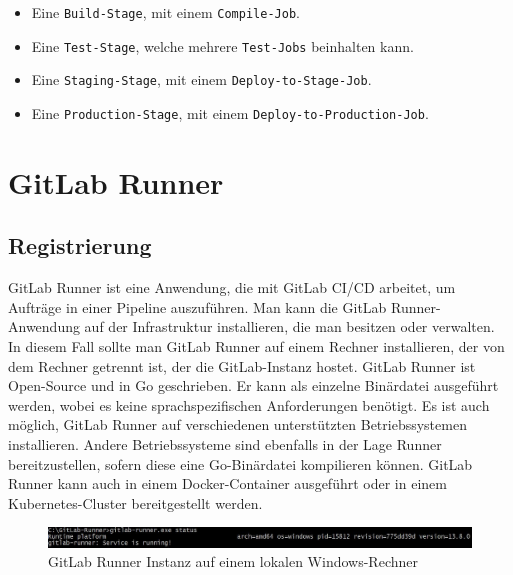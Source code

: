\begin{itemize}
	\item Eine \colorbox{MyLightGrayBackgroundForCode}{\texttt{Build-Stage}}, mit einem \colorbox{MyLightGrayBackgroundForCode}{\texttt{Compile-Job}}.
	\item Eine \colorbox{MyLightGrayBackgroundForCode}{\texttt{Test-Stage}}, welche mehrere \colorbox{MyLightGrayBackgroundForCode}{\texttt{Test-Jobs}} beinhalten kann.
	\item Eine \colorbox{MyLightGrayBackgroundForCode}{\texttt{Staging-Stage}}, mit einem \colorbox{MyLightGrayBackgroundForCode}{\texttt{Deploy-to-Stage-Job}}.
	\item Eine \colorbox{MyLightGrayBackgroundForCode}{\texttt{Production-Stage}}, mit einem \colorbox{MyLightGrayBackgroundForCode}{\texttt{Deploy-to-Production-Job}}.
\end{itemize}

\section{GitLab Runner} \label{sec:lblGitLabRunner}
\subsection{Registrierung}

GitLab Runner ist eine Anwendung, die mit GitLab CI/CD arbeitet, um Aufträge in einer Pipeline auszuführen.
Man kann die GitLab Runner-Anwendung auf der Infrastruktur installieren, die man besitzen oder verwalten. In diesem Fall sollte man GitLab Runner auf einem Rechner installieren, der von dem Rechner getrennt ist, der die GitLab-Instanz hostet. GitLab Runner ist Open-Source und in Go geschrieben. Er kann als einzelne Binärdatei ausgeführt werden, wobei es keine sprachspezifischen Anforderungen benötigt.
Es ist auch möglich, GitLab Runner auf verschiedenen unterstützten Betriebssystemen installieren. Andere Betriebssysteme sind ebenfalls in der Lage Runner bereitzustellen, sofern diese eine Go-Binärdatei kompilieren können.
GitLab Runner kann auch in einem Docker-Container ausgeführt oder in einem Kubernetes-Cluster bereitgestellt werden.\autocite{gitlabRunner}

\begin{figure}[h]
	\centerline{
		\includegraphics[width=1.1\textwidth]{./grafiken/gitlab_runner_status.JPG}
	}
	\vskip0pt
	\caption{GitLab Runner Instanz auf einem lokalen Windows-Rechner}
\end{figure}

